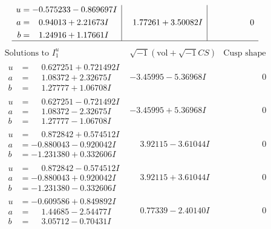\documentclass[1p]{elsarticle_modified}
\theoremstyle{definition}
\newcommand{\I}{\sqrt{-1}}
\begin{document}
$$\begin{array}{c|c|c}
\begin{aligned}
u &= -0.575233 - 0.869697 I \\
a &= \phantom{-}0.94013 + 2.21673 I \\
b &= \phantom{-}1.24916 + 1.17661 I\end{aligned}
 & \phantom{-}1.77261 + 3.50082 I & \phantom{-0.000000 } 0\\
 \hline 
 \end{array}$$\newpage$$\begin{array}{c|c|c}  
\text{Solutions to }I^u_{1}& \I (\text{vol} + \sqrt{-1}CS) & \text{Cusp shape}\\
 \hline 
\begin{aligned}
u &= \phantom{-}0.627251 + 0.721492 I \\
a &= \phantom{-}1.08372 + 2.32675 I \\
b &= \phantom{-}1.27777 + 1.06708 I\end{aligned}
 & -3.45995 - 5.36968 I & \phantom{-0.000000 } 0 \\ \hline\begin{aligned}
u &= \phantom{-}0.627251 - 0.721492 I \\
a &= \phantom{-}1.08372 - 2.32675 I \\
b &= \phantom{-}1.27777 - 1.06708 I\end{aligned}
 & -3.45995 + 5.36968 I & \phantom{-0.000000 } 0 \\ \hline\begin{aligned}
u &= \phantom{-}0.872842 + 0.574512 I \\
a &= -0.880043 - 0.920042 I \\
b &= -1.231380 + 0.332606 I\end{aligned}
 & \phantom{-}3.92115 - 3.61044 I & \phantom{-0.000000 } 0 \\ \hline\begin{aligned}
u &= \phantom{-}0.872842 - 0.574512 I \\
a &= -0.880043 + 0.920042 I \\
b &= -1.231380 - 0.332606 I\end{aligned}
 & \phantom{-}3.92115 + 3.61044 I & \phantom{-0.000000 } 0 \\ \hline\begin{aligned}
u &= -0.609586 + 0.849892 I \\
a &= \phantom{-}1.44685 - 2.54477 I \\
b &= \phantom{-}3.05712 - 0.70431 I\end{aligned}
 & \phantom{-}0.77339 - 2.40140 I & \phantom{-0.000000 } 0 \\ \hline\begin{aligned}

\end{aligned}
\end{array}$$
\end{document}
